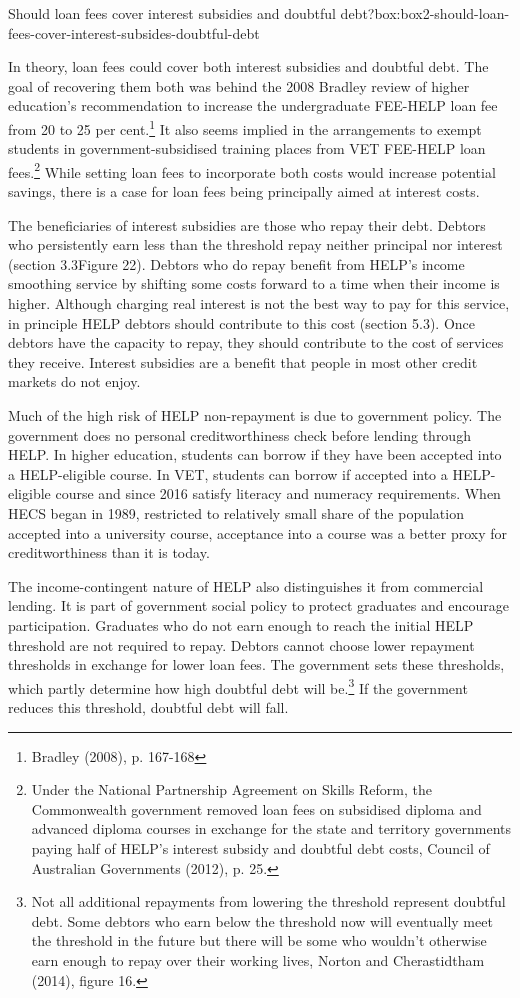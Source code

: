 \documentclass[embargoed]{grattan}
\begin{document}
\begin{bigbox*}{Should loan fees cover interest subsidies and doubtful debt?}{box:box2-should-loan-fees-cover-interest-subsides-doubtful-debt}

In theory, loan fees could cover both interest subsidies and doubtful debt. The goal of recovering them both was behind the 2008 Bradley review of higher education's recommendation to increase the undergraduate FEE-HELP loan fee from 20 to 25 per cent.\footnote{Bradley (2008), p. 167-168} It also seems implied in the arrangements to exempt students in government-subsidised training places from VET FEE-HELP loan fees.\footnote{Under the National Partnership Agreement on Skills Reform, the Commonwealth government removed loan fees on subsidised diploma and advanced diploma courses in exchange for the state and territory governments paying half of HELP's interest subsidy and doubtful debt costs, Council of Australian Governments (2012), p. 25.} While setting loan fees to incorporate both costs would increase potential savings, there is a case for loan fees being principally aimed at interest costs.

The beneficiaries of interest subsidies are those who repay their debt. Debtors who persistently earn less than the threshold repay neither principal nor interest (section 3.3Figure 22). Debtors who do repay benefit from HELP's income smoothing service by shifting some costs forward to a time when their income is higher. Although charging real interest is not the best way to pay for this service, in principle HELP debtors should contribute to this cost (section 5.3). Once debtors have the capacity to repay, they should contribute to the cost of services they receive. Interest subsidies are a benefit that people in most other credit markets do not enjoy.

Much of the high risk of HELP non-repayment is due to government policy. The government does no personal creditworthiness check before lending through HELP. In higher education, students can borrow if they have been accepted into a HELP-eligible course. In VET, students can borrow if accepted into a HELP-eligible course and since 2016 satisfy literacy and numeracy requirements. When HECS began in 1989, restricted to relatively small share of the population accepted into a university course, acceptance into a course was a better proxy for creditworthiness than it is today.

The income-contingent nature of HELP also distinguishes it from commercial lending. It is part of government social policy to protect graduates and encourage participation. Graduates who do not earn enough to reach the initial HELP threshold are not required to repay. Debtors cannot choose lower repayment thresholds in exchange for lower loan fees. The government sets these thresholds, which partly determine how high doubtful debt will be.\footnote{Not all additional repayments from lowering the threshold represent doubtful debt. Some debtors who earn below the threshold now will eventually meet the threshold in the future but there will be some who wouldn't otherwise earn enough to repay over their working lives, Norton and Cherastidtham (2014), figure 16.} If the government reduces this threshold, doubtful debt will fall.


\end{bigbox*}
\end{document}
